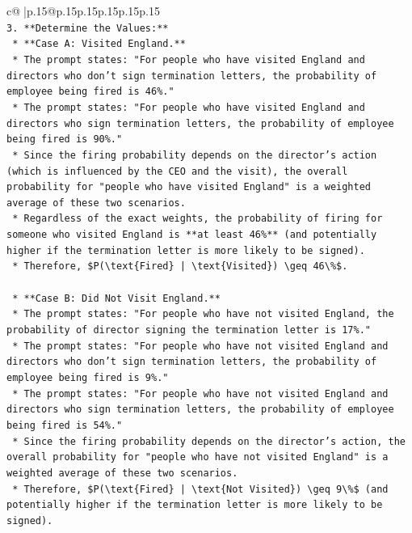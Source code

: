 \documentclass{article}
\begin{document}
{\begin{supertabular}{c@{$\;$}|p{.15\linewidth}@{}p{.15\linewidth}p{.15\linewidth}p{.15\linewidth}p{.15\linewidth}p{.15\linewidth}}
{{{\\ 
\texttt{3.  **Determine the Values:**} \\
\texttt{    *   **Case A: Visited England.**} \\
\texttt{        *   The prompt states: "For people who have visited England and directors who don't sign termination letters, the probability of employee being fired is 46\%."} \\
\texttt{        *   The prompt states: "For people who have visited England and directors who sign termination letters, the probability of employee being fired is 90\%."} \\
\texttt{        *   Since the firing probability depends on the director's action (which is influenced by the CEO and the visit), the overall probability for "people who have visited England" is a weighted average of these two scenarios.} \\
\texttt{        *   Regardless of the exact weights, the probability of firing for someone who visited England is **at least 46\%** (and potentially higher if the termination letter is more likely to be signed).} \\
\texttt{        *   Therefore, \$P(\textbackslash{}text\{Fired\} | \textbackslash{}text\{Visited\}) \textbackslash{}geq 46\textbackslash{}\%\$.} \\
\\ 
\texttt{    *   **Case B: Did Not Visit England.**} \\
\texttt{        *   The prompt states: "For people who have not visited England, the probability of director signing the termination letter is 17\%."} \\
\texttt{        *   The prompt states: "For people who have not visited England and directors who don't sign termination letters, the probability of employee being fired is 9\%."} \\
\texttt{        *   The prompt states: "For people who have not visited England and directors who sign termination letters, the probability of employee being fired is 54\%."} \\
\texttt{        *   Since the firing probability depends on the director's action, the overall probability for "people who have not visited England" is a weighted average of these two scenarios.} \\
\texttt{        *   Therefore, \$P(\textbackslash{}text\{Fired\} | \textbackslash{}text\{Not Visited\}) \textbackslash{}geq 9\textbackslash{}\%\$ (and potentially higher if the termination letter is more likely to be signed).} \\
}}}
\end{supertabular}}
\end{document}
